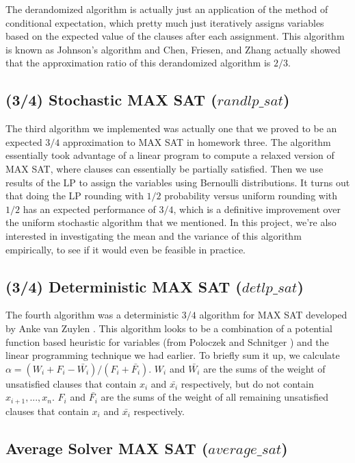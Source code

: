 \documentclass[paper=a4, fontsize=11pt]{scrartcl} %
\numberwithin{equation}{section} %
\numberwithin{figure}{section} %
\numberwithin{table}{section} %
\begin{document}
The derandomized algorithm is actually just an application of the method of conditional expectation, which pretty much just iteratively assigns variables based on the expected value of the clauses after each assignment.  This algorithm is known as Johnson's algorithm \cite{Johnson1973} and Chen, Friesen, and Zhang \cite{Chenetal1999} actually showed that the approximation ratio of this derandomized algorithm is $2/3$.  

\subsection{(3/4) Stochastic MAX SAT ($randlp\_sat$)}

The third algorithm we implemented was actually one that we proved to be an expected $3/4$ approximation to MAX SAT in homework three.  The algorithm essentially took advantage of a linear program to compute a relaxed version of MAX SAT, where clauses can essentially be partially satisfied.  Then we use results of the LP to assign the variables using Bernoulli distributions.  It turns out that doing the LP rounding with $1/2$ probability versus uniform rounding with $1/2$ has an expected performance of $3/4$, which is a definitive improvement over the uniform stochastic algorithm that we mentioned.  In this project, we're also interested in investigating the mean and the variance of this algorithm empirically, to see if it would even be feasible in practice.  

\subsection{(3/4) Deterministic MAX SAT ($detlp\_sat$)}

The fourth algorithm was a deterministic $3/4$ algorithm for MAX SAT developed by Anke van Zuylen \cite{Zuylen}.  This algorithm looks to be a combination of a potential function based heuristic for variables (from Poloczek and Schnitger \cite{PoloczekandSchnitger2011}) and the linear programming technique we had earlier.  To briefly sum it up, we calculate $\alpha = (W_i + F_i - \bar{W_i})/(F_i + \bar{F_i})$.  $W_i$ and $\bar{W_i}$ are the sums of the weight of unsatisfied clauses that contain $x_i$ and $\bar{x_i}$ respectively, but do not contain $x_{i+1},...,x_n$.  $F_i$ and $\bar{F_i}$ are the sums of the weight of all remaining unsatisfied clauses that contain $x_i$ and $\bar{x_i}$ respectively.

\subsection{Average Solver MAX SAT ($average\_sat$)}
\end{document}

